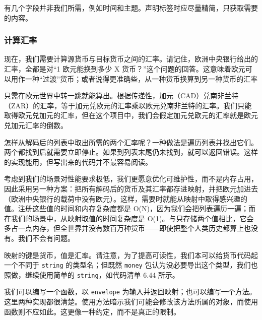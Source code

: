 有几个字段并非我们所需，例如时间和主题。声明标签时应尽量精简，只获取需要的内容。

\subsubsection*{计算汇率}

现在，我们需要计算源货币与目标货币之间的汇率。请记住，欧洲中央银行给出的汇率，全都是对“1 欧元能换到多少 X 货币？”这个问题的回答。这意味着欧元可以用作一种“过渡”货币；或者说得更准确些，从一种货币换算到另一种货币的汇率

只需在欧元世界中转一跳就能算出。根据传递性，加元（CAD）兑南非兰特（ZAR）的汇率，等于加元兑欧元的汇率乘以欧元兑南非兰特的汇率。我们只能取得欧元兑加元的汇率，但在这个项目中，我们会假定加元兑欧元的汇率就是欧元兑加元汇率的倒数。

怎样从解码后的列表中取出所需的两个汇率呢？一种做法是遍历列表并找出它们。两个都找到后就需要立即停止。如果到列表末尾仍未找到，就可以返回错误。这样的实现能用，但写出来的代码并不最容易阅读。

考虑到我们的场景对性能要求极低，我们更愿意优化可维护性，而不是内存占用，因此采用另一种方案：把所有解码后的货币及其汇率都存进映射，并把欧元加进去（欧洲中央银行的载荷中没有欧元）。这样，需要时就能从映射中取得感兴趣的值。注册这些值的时间和内存复杂度都是 O(N)，因为我们会把列表遍历一遍；而在我们的场景中，从映射取值的时间复杂度是 O(1)。与只存储两个值相比，它会多占一点内存，但全世界并没有数百万种货币——即使把整个人类历史都算上也没有。我们不会有问题。

映射的键是货币，值是汇率。请注意，为了提高可读性，我们本可以给货币代码起一个不同于 \texttt{string} 的类型名；但既然 \texttt{money} 包认为没必要导出这个类型，我们也照做，继续使用简单的 \texttt{string}，如代码清单 6.44 所示。

我们可以编写一个函数，以 \texttt{envelope} 为输入并返回映射；也可以编写一个方法。这里两种实现都很清楚。使用方法暗示我们可能会修改该方法所属的对象，而使用函数则不应如此。这更像一种约定，而不是真正的限制。


